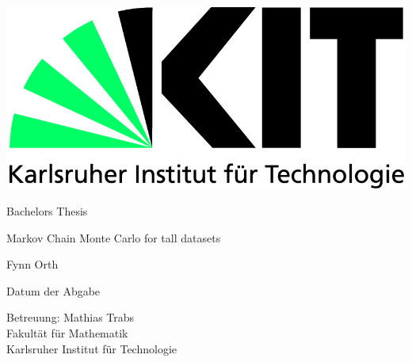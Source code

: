\documentclass[12pt,a4paper]{scrartcl}
\numberwithin{equation}{section}
\begin{document}
  \pagestyle{empty}

  \begin{titlepage}

    \includegraphics[scale=0.45]{kit-logo.jpg} 
    \vspace*{2cm} 

 \begin{center} \large 
    
    Bachelors Thesis
    \vspace*{2cm}

    {\huge Markov Chain Monte Carlo for tall datasets}
    \vspace*{2.5cm}

    Fynn Orth
    \vspace*{1.5cm}

    Datum der Abgabe
    \vspace*{4.5cm}


    Betreuung: Mathias Trabs \\[1cm]
    Fakultät für Mathematik \\[1cm]
		Karlsruher Institut für Technologie
  \end{center}
\end{titlepage}



  \tableofcontents

\newpage
 


  \pagestyle{headings}

 \newpage  %




\end{document}
